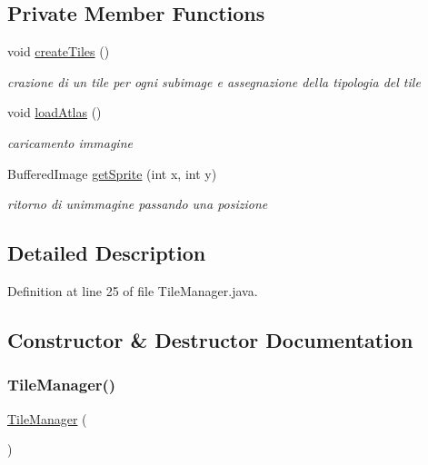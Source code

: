 \subsection*{Private Member Functions}
\begin{DoxyCompactItemize}
\item 
void \hyperlink{classmanagers_1_1_tile_manager_abb7fa074b36e6e355db16761115fb367}{create\+Tiles} ()
\begin{DoxyCompactList}\small\item\em crazione di un tile per ogni subimage e assegnazione della tipologia del tile \end{DoxyCompactList}\item 
void \hyperlink{classmanagers_1_1_tile_manager_afc6b9f4a25216ec36baa6e7518a7501a}{load\+Atlas} ()
\begin{DoxyCompactList}\small\item\em caricamento immagine \end{DoxyCompactList}\item 
Buffered\+Image \hyperlink{classmanagers_1_1_tile_manager_a96613c34a7cfb5341cc3c6a4fe3612a1}{get\+Sprite} (int x, int y)
\begin{DoxyCompactList}\small\item\em ritorno di un\textquotesingle{}immagine passando una posizione \end{DoxyCompactList}\end{DoxyCompactItemize}


\subsection{Detailed Description}


Definition at line 25 of file Tile\+Manager.\+java.



\subsection{Constructor \& Destructor Documentation}
\mbox{\label{classmanagers_1_1_tile_manager_a041c1b12a4eb5574dfedf0af6393c014}} 
\subsubsection{\texorpdfstring{Tile\+Manager()}{TileManager()}}
{\footnotesize\ttfamily \hyperlink{classmanagers_1_1_tile_manager}{Tile\+Manager} (\begin{DoxyParamCaption}{ }\end{DoxyParamCaption})}



